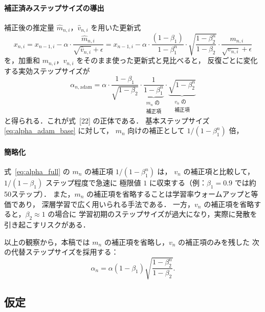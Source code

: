 \documentclass[dvipdfmx,a4paper,11pt]{jsarticle}
\begin{document}
\paragraph{補正済みステップサイズの導出}

補正後の推定量 $\hat{m}_{n,i}$，$\hat{v}_{n,i}$ を用いた更新式
\begin{equation}
    x_{n,i}
    = x_{n-1,i}
      - \alpha \cdot \frac{\hat{m}_{n,i}}{\sqrt{\hat{v}_{n,i}} + \epsilon}
    = x_{n-1,i}
      - \alpha \cdot
        \frac{(1-\beta_1)}{1-\beta_1^n} \cdot
        \sqrt{\frac{1-\beta_2^n}{1-\beta_2}} \cdot
        \frac{m_{n,i}}{\sqrt{v_{n,i}} + \epsilon}
\end{equation}
を，加重和 $m_{n,i}$，$v_{n,i}$ をそのまま使った更新式と見比べると，
反復ごとに変化する実効ステップサイズが
\begin{equation}
    \alpha_{n,\mathrm{adam}}
    = \alpha \cdot \frac{1-\beta_1}{\sqrt{1-\beta_2}}
      \cdot \underbrace{\frac{1}{1-\beta_1^n}}_{\substack{m_n \text{ の}\\\text{補正項}}}
      \cdot \underbrace{\sqrt{1-\beta_2^n}}_{\substack{v_n \text{ の}\\\text{補正項}}}
    \label{eq:alpha_full}
\end{equation}
と得られる．これが式~[22] の正体である．
基本ステップサイズ \eqref{eq:alpha_adam_base} に対して，
$m_n$ 向けの補正として $1/(1-\beta_1^n)$ 倍，

\paragraph{簡略化}

式~\eqref{eq:alpha_full} の $m_n$ の補正項 $1/(1-\beta_1^n)$ は，
$v_n$ の補正項と比較して，$1/(1-\beta_1)$ ステップ程度で急速に
極限値 $1$ に収束する（例：$\beta_1=0.9$ では約50ステップ）．
また，$m_n$ の補正項を省略することは学習率ウォームアップと等価であり，
深層学習で広く用いられる手法である．
一方，$v_n$ の補正項を省略すると，$\beta_2 \approx 1$ の場合に
学習初期のステップサイズが過大になり，実際に発散を引き起こすリスクがある．

以上の観察から，本稿では $m_n$ の補正項を省略し，$v_n$ の補正項のみを残した
次の代替ステップサイズを採用する：
\begin{equation}
    \alpha_n
    = \alpha(1-\beta_1)\sqrt{\frac{1-\beta_2^n}{1-\beta_2}}.
    \label{eq:alpha_simplified}
\end{equation}


\subsection{仮定}
\end{document}
